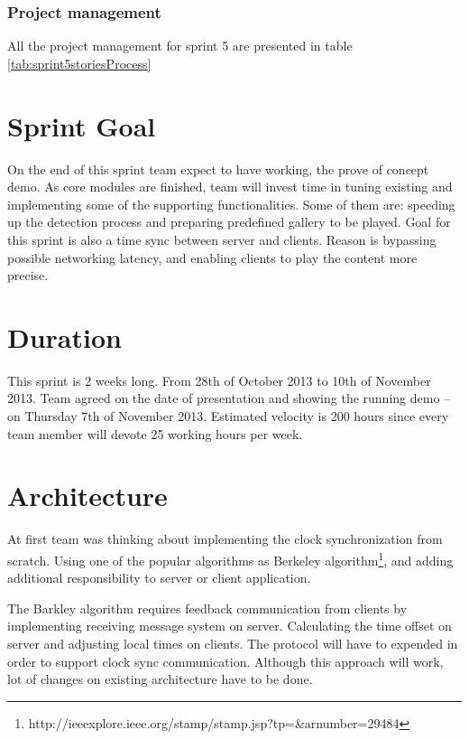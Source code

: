 \subsubsection*{Project management}
All the project management for sprint 5 are presented in table \ref{tab:sprint5storiesProcess}



\section{Sprint Goal}

On the end of this sprint team expect to have working, the prove of concept demo. As core modules are finished, team will invest time in tuning existing and implementing some of the supporting functionalities. Some of them are: speeding up the detection process  and preparing predefined gallery to be played. Goal for this sprint is also a time sync between server and clients. Reason is bypassing possible networking latency, and enabling clients to play the content more precise. 

\section{Duration}
This sprint is 2 weeks long. From 28th of October 2013 to 10th of November 2013. 
Team agreed on the date of presentation and showing the running demo – on Thursday 7th of November 2013.
Estimated velocity is 200 hours since every team member will devote 25 working hours per week.

\section{Architecture}

At first team was thinking about implementing the clock synchronization from scratch. Using one of the popular algorithms as Berkeley algorithm\footnote{http://ieeexplore.ieee.org/stamp/stamp.jsp?tp=\&arnumber=29484}, and adding additional responsibility to server or client application. 

The Barkley algorithm requires feedback communication from clients by implementing receiving message system on server. Calculating the time offset on server and adjusting local times on clients. The protocol will have to expended in order to support clock sync communication. Although this approach will work, lot of changes on existing architecture have to be done.

